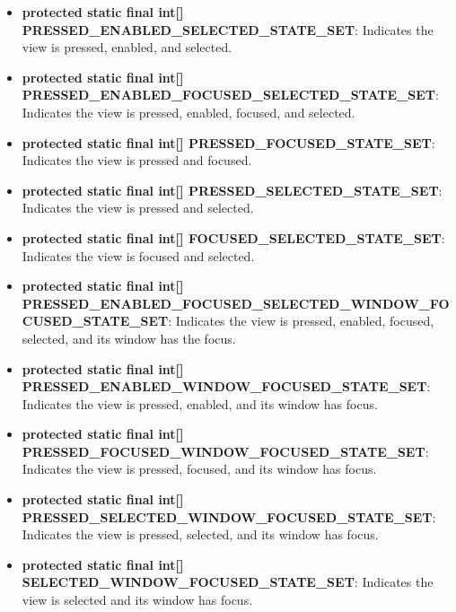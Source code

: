 \documentclass{report}
\begin{document}
\begin{itemize}
\begin{itemize}
                \item \textbf{protected static final int[] PRESSED\_ENABLED\_SELECTED\_STATE\_SET}:  
                    Indicates the view is pressed, enabled, and selected.

                \item \textbf{protected static final int[] PRESSED\_ENABLED\_FOCUSED\_SELECTED\_STATE\_SET}:  
                    Indicates the view is pressed, enabled, focused, and selected.

                \item \textbf{protected static final int[] PRESSED\_FOCUSED\_STATE\_SET}:  
                    Indicates the view is pressed and focused.

                \item \textbf{protected static final int[] PRESSED\_SELECTED\_STATE\_SET}:  
                    Indicates the view is pressed and selected.

                \item \textbf{protected static final int[] FOCUSED\_SELECTED\_STATE\_SET}:  
                    Indicates the view is focused and selected.

                \item \textbf{protected static final int[] PRESSED\_ENABLED\_FOCUSED\_SELECTED\_WINDOW\_FOCUSED\_STATE\_SET}:  
                    Indicates the view is pressed, enabled, focused, selected, and its window has the focus.

                \item \textbf{protected static final int[] PRESSED\_ENABLED\_WINDOW\_FOCUSED\_STATE\_SET}:  
                    Indicates the view is pressed, enabled, and its window has focus.

                \item \textbf{protected static final int[] PRESSED\_FOCUSED\_WINDOW\_FOCUSED\_STATE\_SET}:  
                    Indicates the view is pressed, focused, and its window has focus.

                \item \textbf{protected static final int[] PRESSED\_SELECTED\_WINDOW\_FOCUSED\_STATE\_SET}:  
                    Indicates the view is pressed, selected, and its window has focus.

                \item \textbf{protected static final int[] SELECTED\_WINDOW\_FOCUSED\_STATE\_SET}:  
                    Indicates the view is selected and its window has focus.


\end{itemize}
\end{itemize}
\end{document}
